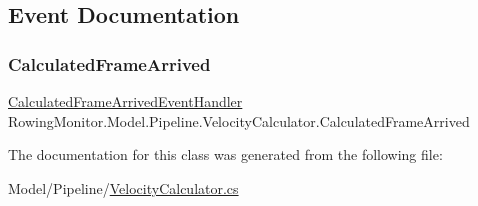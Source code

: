 \subsection{Event Documentation}
\mbox{\label{class_rowing_monitor_1_1_model_1_1_pipeline_1_1_velocity_calculator_ad0b95bfb006ea268ea476f1da13bc7da}} 
\subsubsection{\texorpdfstring{Calculated\+Frame\+Arrived}{CalculatedFrameArrived}}
{\footnotesize\ttfamily \hyperlink{class_rowing_monitor_1_1_model_1_1_pipeline_1_1_velocity_calculator_a8788be37e2e5ff495980455003f16b94}{Calculated\+Frame\+Arrived\+Event\+Handler} Rowing\+Monitor.\+Model.\+Pipeline.\+Velocity\+Calculator.\+Calculated\+Frame\+Arrived}



The documentation for this class was generated from the following file\+:\begin{DoxyCompactItemize}
\item 
Model/\+Pipeline/\hyperlink{_velocity_calculator_8cs}{Velocity\+Calculator.\+cs}\end{DoxyCompactItemize}

